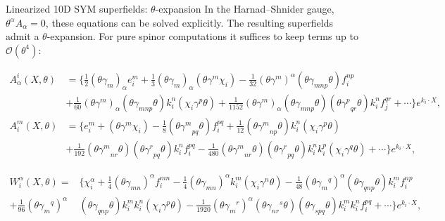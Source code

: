 \documentclass{beamer}
\begin{document}
\begin{frame}[allowframebreaks]{Linearized 10D SYM superfields: $\theta$-expansion}
	In the Harnad–Shnider gauge, $\theta^\alpha A_\alpha=0$, these equations can be solved explicitly. 
	The resulting superfields admit a $\theta$-expansion. For pure spinor computations it suffices to keep 
	terms up to $\mathcal{O}(\theta^4)$:
	\begin{footnotesize}
		\begin{equation*}
		\begin{aligned}
			A^i_\alpha(X,\theta) &= 
			\Biggl\{
			\frac{1}{2} (\theta \gamma_m)_\alpha e_i^m
			+ \frac{1}{3} (\theta \gamma_m)_\alpha (\theta \gamma^m \chi_i)
			- \frac{1}{32} (\theta \gamma^m)^\alpha (\theta \gamma_{mnp}\theta) f_i^{np} \\
			&+ \frac{1}{60} (\theta \gamma^m)_\alpha (\theta \gamma_{mnp}\theta) k_i^n (\chi_i \gamma^p \theta)
			+ \frac{1}{1152} (\theta \gamma^m)_\alpha (\theta \gamma_{mnp}\theta) (\theta {\gamma^p}_{qr}\theta) k_i^n f_j^{qr}
			+ \cdots
			\Biggr\} e^{k_i \cdot X},\\
			A^m_i(X,\theta) &= 
			\Biggl\{
			e_i^m
			+ (\theta \gamma^m \chi_i)
			- \frac{1}{8} (\theta {\gamma^m}_{pq}\theta) f_i^{pq}
			+ \frac{1}{12} (\theta {\gamma^m}_{np}\theta) k_i^n (\chi_i \gamma^p \theta) \\
			&+ \frac{1}{192} (\theta {\gamma^m}_{nr}\theta)(\theta {\gamma^r}_{pq}\theta) k_i^n f_i^{pq}
			- \frac{1}{480} (\theta {\gamma^m}_{nr}\theta)(\theta {\gamma^r}_{pq}\theta) k_i^n k_i^p (\chi_i \gamma^q \theta) 
			+ \cdots
			\Biggr\} e^{k_i \cdot X},
		\end{aligned}
	\end{equation*}
	\end{footnotesize}
	\begin{footnotesize}
	\begin{equation*}
		\begin{aligned}
			W^\alpha_i(X,\theta) =& 
			\Biggl\{
			\chi_i^\alpha
			+ \frac{1}{4} (\theta \gamma_{mn})^\alpha f_i^{mn}
			- \frac{1}{4} (\theta \gamma_{mn})^\alpha k_i^m (\chi_i \gamma^n \theta)
			- \frac{1}{48} (\theta \gamma_m{}^q)^\alpha (\theta \gamma_{qnp}\theta) k_i^m f_i^{np} \\
			+ \frac{1}{96} (\theta \gamma_m{}^q)^\alpha& (\theta \gamma_{qnp}\theta) k_i^m k_i^n (\chi_i \gamma^p \theta)
			- \frac{1}{1920} (\theta \gamma_m{}^r)^\alpha (\theta {\gamma_{nr}}^s\theta)(\theta \gamma_{spq}\theta) k_i^m k_i^n f_i^{pq}
			+ \cdots
			\Biggr\} e^{k_i \cdot X},\\

\end{aligned}
\end{equation*}
\end{footnotesize}
\end{frame}
\end{document}
